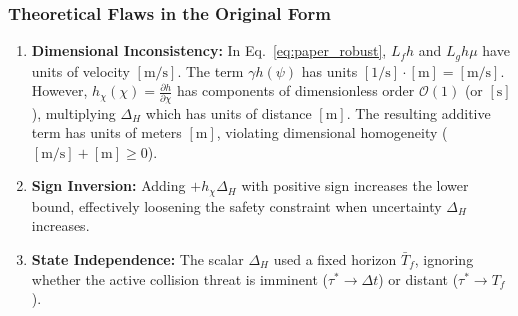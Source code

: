 \documentclass[10pt,twocolumn,a4paper]{article}
\begin{document}
\subsubsection{Theoretical Flaws in the Original Form}
\begin{enumerate}
    \item \textbf{Dimensional Inconsistency:} In Eq.~\eqref{eq:paper_robust}, $L_f h$ and $L_g h \mu$ have units of velocity $[\text{m/s}]$. The term $\gamma h(\psi)$ has units $[1/\text{s}] \cdot [\text{m}] = [\text{m/s}]$. However, $h_\chi(\chi) = \frac{\partial h}{\partial \chi}$ has components of dimensionless order $\mathcal{O}(1)$ (or $[\text{s}]$), multiplying $\Delta_H$ which has units of distance $[\text{m}]$. The resulting additive term has units of meters $[\text{m}]$, violating dimensional homogeneity ($[\text{m/s}] + [\text{m}] \ge 0$).
    \item \textbf{Sign Inversion:} Adding $+h_\chi \Delta_H$ with positive sign increases the lower bound, effectively loosening the safety constraint when uncertainty $\Delta_H$ increases.
    \item \textbf{State Independence:} The scalar $\Delta_H$ used a fixed horizon $\bar{T}_f$, ignoring whether the active collision threat is imminent ($\tau^* \to \Delta t$) or distant ($\tau^* \to T_f$).
\end{enumerate}
\end{document}
